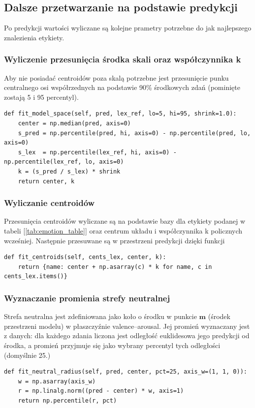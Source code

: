\subsection{Dalsze przetwarzanie na podstawie predykcji}
Po predykcji wartości wyliczane są kolejne prametry potrzebne do jak najlepszego znalezienia 
etykiety.

\subsubsection{Wyliczenie przesunięcia środka skali oraz współczynnika k}
Aby nie posiadać centroidów poza skalą potrzebne jest przesunięcie punku centralnego osi 
współrzednych na podstawie 90\% środkowych zdań (pominięte zostają 5 i 95 percentyl).

\begin{lstlisting}[style=pythonStyle, label={lst:cent_func}, caption={
    Funkcja do obliczania cetrum oraz współczynnika k.
}]
def fit_model_space(self, pred, lex_ref, lo=5, hi=95, shrink=1.0):
    center = np.median(pred, axis=0)
    s_pred = np.percentile(pred, hi, axis=0) - np.percentile(pred, lo, axis=0)
    s_lex  = np.percentile(lex_ref, hi, axis=0) - np.percentile(lex_ref, lo, axis=0)
    k = (s_pred / s_lex) * shrink
    return center, k
\end{lstlisting}

\subsubsection{Wyliczanie centroidów}
Przesunięcia centroidów wyliczane są na podstawie bazy dla etykiety podanej w tabeli 
[\ref{tab:emotion_table}] oraz centrum układu i współczynnika k policznych wcześniej. Następnie 
przesuwane są w przestrzeni predykcji dzięki funkcji
\begin{lstlisting}[style=pythonStyle, label={lst:cetroid_func}, caption={
    Funkcja obliczająca centroidy dla podanych etykiet.
}]
def fit_centroids(self, cents_lex, center, k):
    return {name: center + np.asarray(c) * k for name, c in cents_lex.items()}
\end{lstlisting} 

\subsubsection{Wyznaczanie promienia strefy neutralnej}
Strefa neutralna jest zdefiniowana jako koło o środku w punkcie $\mathbf{m}$
(środek przestrzeni modelu) w płaszczyźnie valence--arousal. Jej promień
wyznaczany jest z danych: dla każdego zdania liczona jest odległość euklidesowa
jego predykcji od środka, a promień przyjmuje się jako wybrany percentyl tych
odległości (domyślnie 25.)
\begin{lstlisting}[style=pythonStyle, label={lst:radius_func}, caption={
    Funkcja do obliczania promienia neutralności dla 25 percentyla.
}]
def fit_neutral_radius(self, pred, center, pct=25, axis_w=(1, 1, 0)):
    w = np.asarray(axis_w)
    r = np.linalg.norm((pred - center) * w, axis=1)
    return np.percentile(r, pct)
\end{lstlisting}



